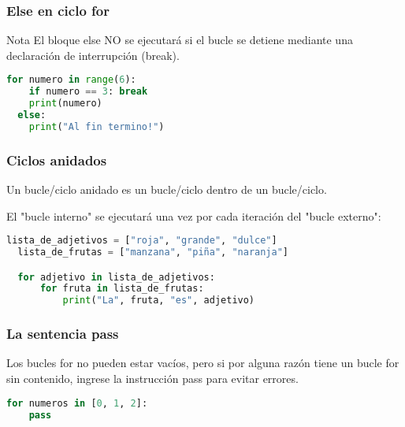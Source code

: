 \begin{frame}[fragile]
  \frametitle{\textbf{Else} en ciclo \textbf{for}}

  \begin{alertblock}{Nota}
    El bloque else NO se ejecutará si el bucle se detiene
    mediante una declaración de interrupción (break).
  \end{alertblock}

  \vspace{\baselineskip}
  \begin{lstlisting}[language=Python]
  for numero in range(6):
    if numero == 3: break
    print(numero)
  else:
    print("Al fin termino!")
  \end{lstlisting}
\end{frame}

\begin{frame}[fragile]
  \frametitle{Ciclos anidados}

  Un bucle/ciclo anidado es un bucle/ciclo dentro de un bucle/ciclo.

  \vspace{\baselineskip}
  El "bucle interno" se ejecutará una vez por cada iteración del
  "bucle externo":

  \vspace{\baselineskip}
  \begin{lstlisting}[language=Python]
  lista_de_adjetivos = ["roja", "grande", "dulce"]
  lista_de_frutas = ["manzana", "piña", "naranja"]

  for adjetivo in lista_de_adjetivos:
      for fruta in lista_de_frutas:
          print("La", fruta, "es", adjetivo)
  \end{lstlisting}
\end{frame}

\begin{frame}[fragile]
  \frametitle{La sentencia \textbf{pass}}

  Los bucles for no pueden estar vacíos, pero si por alguna
  razón tiene un bucle for sin contenido, ingrese la instrucción
  pass para evitar errores.

  \vspace{\baselineskip}
  \begin{lstlisting}[language=Python]
  for numeros in [0, 1, 2]:
    pass
  \end{lstlisting}
\end{frame}
